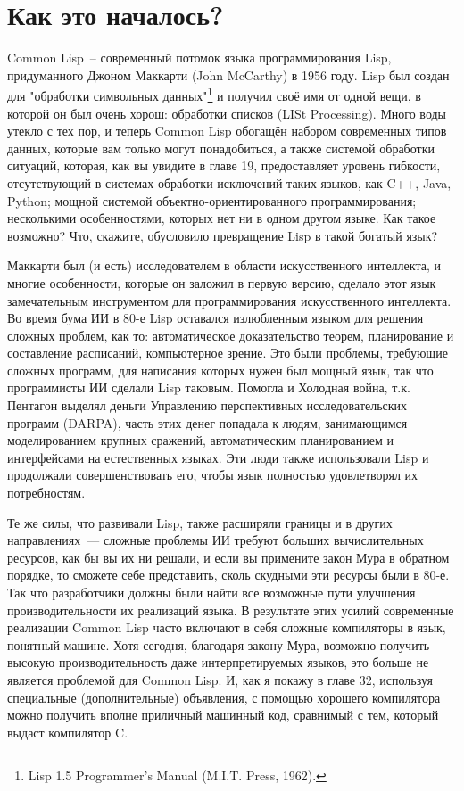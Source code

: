 \section{Как это началось?}

Common Lisp~-- современный потомок языка программирования Lisp, придуманного Джоном
Маккарти (John McCarthy) в 1956 году. Lisp был создан для "обработки символьных
данных"\footnote{Lisp 1.5 Programmer's Manual (M.I.T. Press, 1962).} и получил своё имя от
одной вещи, в которой он был очень хорош: обработки списков (LISt Processing). Много воды
утекло с тех пор, и теперь Common Lisp обогащён набором современных типов данных, которые
вам только могут понадобиться, а также системой обработки ситуаций, которая, как вы
увидите в главе 19, предоставляет уровень гибкости, отсутствующий в системах обработки
исключений таких языков, как C++, Java, Python; мощной системой объектно-ориентированного
программирования; несколькими особенностями, которых нет ни в одном другом языке. Как
такое возможно? Что, скажите, обусловило превращение Lisp в такой богатый язык?

Маккарти был (и есть) исследователем в области искусственного интеллекта, и многие
особенности, которые он заложил в первую версию, сделало этот язык замечательным
инструментом для программирования искусственного интеллекта. Во время бума ИИ в 80-е Lisp
оставался излюбленным языком для решения сложных проблем, как то: автоматическое
доказательство теорем, планирование и составление расписаний, компьютерное зрение. Это
были проблемы, требующие сложных программ, для написания которых нужен был мощный язык,
так что программисты ИИ сделали Lisp таковым. Помогла и Холодная война, т.к. Пентагон
выделял деньги Управлению перспективных исследовательских программ (DARPA), часть этих
денег попадала к людям, занимающимся моделированием крупных сражений, автоматическим
планированием и интерфейсами на естественных языках. Эти люди также использовали Lisp и
продолжали совершенствовать его, чтобы язык полностью удовлетворял их потребностям.

Те же силы, что развивали Lisp, также расширяли границы и в других направлениях~---
сложные проблемы ИИ требуют больших вычислительных ресурсов, как бы вы их ни решали, и
если вы примените закон Мура в обратном порядке, то сможете себе представить, сколь
скудными эти ресурсы были в 80-е. Так что разработчики должны были найти все возможные
пути улучшения производительности их реализаций языка. В результате этих усилий
современные реализации Common Lisp часто включают в себя сложные компиляторы в язык,
понятный машине. Хотя сегодня, благодаря закону Мура, возможно получить высокую
производительность даже интерпретируемых языков, это больше не является проблемой для
Common Lisp. И, как я покажу в главе 32, используя специальные (дополнительные)
объявления, с помощью хорошего компилятора можно получить вполне приличный машинный код,
сравнимый с тем, который выдаст компилятор C.


